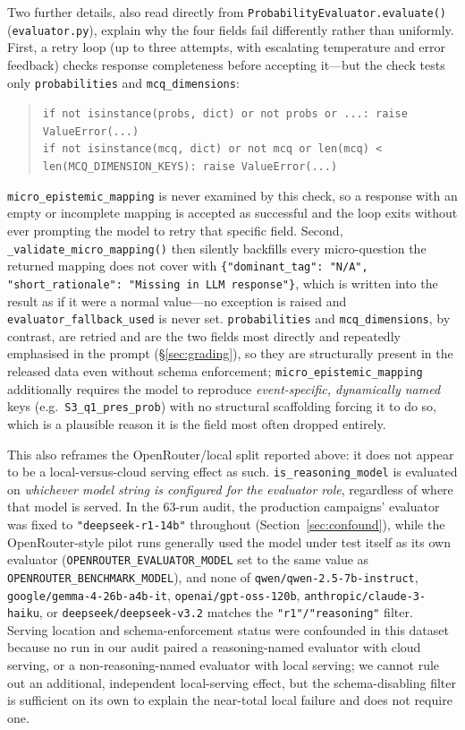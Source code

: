 \documentclass[11pt,journal,onecolumn]{IEEEtran}
\begin{document}
Two further details, also read directly from \texttt{ProbabilityEvaluator.evaluate()} (\texttt{evaluator.py}), explain why the four fields fail differently rather than uniformly. First, a retry loop (up to three attempts, with escalating temperature and error feedback) checks response completeness before accepting it---but the check tests only \texttt{probabilities} and \texttt{mcq\_dimensions}:
\begin{quote}
\texttt{if not isinstance(probs, dict) or not probs or ...: raise ValueError(...)} \\
\texttt{if not isinstance(mcq, dict) or not mcq or len(mcq) < len(MCQ\_DIMENSION\_KEYS): raise ValueError(...)}
\end{quote}
\texttt{micro\_epistemic\_mapping} is never examined by this check, so a response with an empty or incomplete mapping is accepted as successful and the loop exits without ever prompting the model to retry that specific field. Second, \texttt{\_validate\_micro\_mapping()} then silently backfills every micro-question the returned mapping does not cover with \texttt{\{"dominant\_tag": "N/A", "short\_rationale": "Missing in LLM response"\}}, which is written into the result as if it were a normal value---no exception is raised and \texttt{evaluator\_fallback\_used} is never set. \texttt{probabilities} and \texttt{mcq\_dimensions}, by contrast, are retried and are the two fields most directly and repeatedly emphasised in the prompt (\S\ref{sec:grading}), so they are structurally present in the released data even without schema enforcement; \texttt{micro\_epistemic\_mapping} additionally requires the model to reproduce \emph{event-specific, dynamically named} keys (e.g.\ \texttt{S3\_q1\_pres\_prob}) with no structural scaffolding forcing it to do so, which is a plausible reason it is the field most often dropped entirely.

This also reframes the OpenRouter/local split reported above: it does not appear to be a local-versus-cloud serving effect as such. \texttt{is\_reasoning\_model} is evaluated on \emph{whichever model string is configured for the evaluator role}, regardless of where that model is served. In the 63-run audit, the production campaigns' evaluator was fixed to \texttt{"deepseek-r1-14b"} throughout (Section~\ref{sec:confound}), while the OpenRouter-style pilot runs generally used the model under test itself as its own evaluator (\texttt{OPENROUTER\_EVALUATOR\_MODEL} set to the same value as \texttt{OPENROUTER\_BENCHMARK\_MODEL}), and none of \texttt{qwen/\allowbreak qwen-2.5-7b-instruct}, \texttt{google/\allowbreak gemma-4-26b-a4b-it}, \texttt{openai/\allowbreak gpt-oss-120b}, \texttt{anthropic/\allowbreak claude-3-haiku}, or \texttt{deepseek/\allowbreak deepseek-v3.2} matches the \texttt{"r1"/"reasoning"} filter. Serving location and schema-enforcement status were confounded in this dataset because no run in our audit paired a reasoning-named evaluator with cloud serving, or a non-reasoning-named evaluator with local serving; we cannot rule out an additional, independent local-serving effect, but the schema-disabling filter is sufficient on its own to explain the near-total local failure and does not require one.
\end{document}
